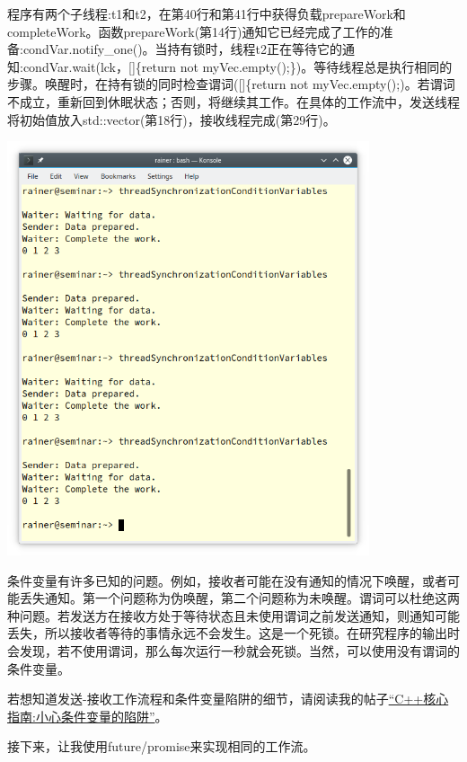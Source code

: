 程序有两个子线程:t1和t2，在第40行和第41行中获得负载prepareWork和completeWork。函数prepareWork(第14行)通知它已经完成了工作的准备:condVar.notify\_one()。当持有锁时，线程t2正在等待它的通知:condVar.wait(lck，[]\{return not myVec.empty();\})。等待线程总是执行相同的步骤。唤醒时，在持有锁的同时检查谓词([]\{return not myVec.empty();)。若谓词不成立，重新回到休眠状态；否则，将继续其工作。在具体的工作流中，发送线程将初始值放入std::vector(第18行)，接收线程完成(第29行)。

\begin{center}
\includegraphics[width=0.8\textwidth]{content/3/chapter6/images/12.png}\\
\end{center}

条件变量有许多已知的问题。例如，接收者可能在没有通知的情况下唤醒，或者可能丢失通知。第一个问题称为伪唤醒，第二个问题称为未唤醒。谓词可以杜绝这两种问题。若发送方在接收方处于等待状态且未使用谓词之前发送通知，则通知可能丢失，所以接收者等待的事情永远不会发生。这是一个死锁。在研究程序的输出时会发现，若不使用谓词，那么每次运行一秒就会死锁。当然，可以使用没有谓词的条件变量。

若想知道发送-接收工作流程和条件变量陷阱的细节，请阅读我的帖子\href{https://www.modernescpp.com/index.php/c-core-guidelines-be-aware-of-the-traps-of-condition-variables}{“C++核心指南:小心条件变量的陷阱”}。

接下来，让我使用future/promise来实现相同的工作流。

